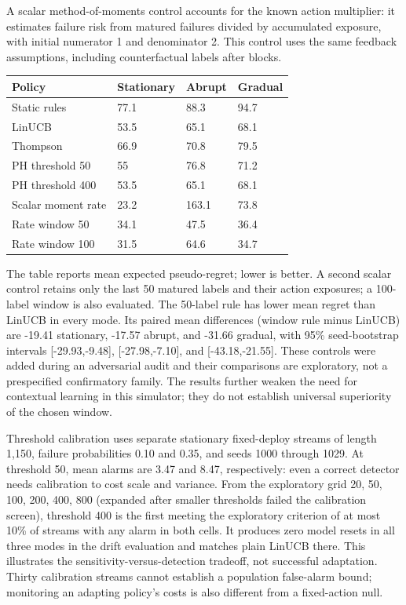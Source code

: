 \documentclass[
  10pt,
]{article}
\begin{document}
A scalar method-of-moments control accounts for the known action
multiplier: it estimates failure risk from matured failures divided by
accumulated exposure, with initial numerator 1 and denominator 2. This
control uses the same feedback assumptions, including counterfactual
labels after blocks.

\par\medskip\noindent\begin{minipage}{\linewidth}\centering
\begin{tabular}{@{}llll@{}}
\toprule\noalign{}
Policy & Stationary & Abrupt & Gradual \\
\midrule\noalign{}
Static rules & 77.1 & 88.3 & 94.7 \\
LinUCB & 53.5 & 65.1 & 68.1 \\
Thompson & 66.9 & 70.8 & 79.5 \\
PH threshold 50 & 55 & 76.8 & 71.2 \\
PH threshold 400 & 53.5 & 65.1 & 68.1 \\
Scalar moment rate & 23.2 & 163.1 & 73.8 \\
Rate window 50 & 34.1 & 47.5 & 36.4 \\
Rate window 100 & 31.5 & 64.6 & 34.7 \\
\bottomrule
\end{tabular}
\end{minipage}\par\medskip

The table reports mean expected pseudo-regret; lower is better. A second
scalar control retains only the last 50 matured labels and their action
exposures; a 100-label window is also evaluated. The 50-label rule has
lower mean regret than LinUCB in every mode. Its paired mean differences
(window rule minus LinUCB) are -19.41 stationary, -17.57 abrupt, and
-31.66 gradual, with 95\% seed-bootstrap intervals {[}-29.93,-9.48{]},
{[}-27.98,-7.10{]}, and {[}-43.18,-21.55{]}. These controls were added
during an adversarial audit and their comparisons are exploratory, not a
prespecified confirmatory family. The results further weaken the need
for contextual learning in this simulator; they do not establish
universal superiority of the chosen window.

Threshold calibration uses separate stationary fixed-deploy streams of
length 1,150, failure probabilities 0.10 and 0.35, and seeds 1000
through 1029. At threshold 50, mean alarms are 3.47 and 8.47,
respectively: even a correct detector needs calibration to cost scale
and variance. From the exploratory grid 20, 50, 100, 200, 400, 800
(expanded after smaller thresholds failed the calibration screen),
threshold 400 is the first meeting the exploratory criterion of at most
10\% of streams with any alarm in both cells. It produces zero model
resets in all three modes in the drift evaluation and matches plain
LinUCB there. This illustrates the sensitivity-versus-detection
tradeoff, not successful adaptation. Thirty calibration streams cannot
establish a population false-alarm bound; monitoring an adapting
policy's costs is also different from a fixed-action null.
\end{document}
